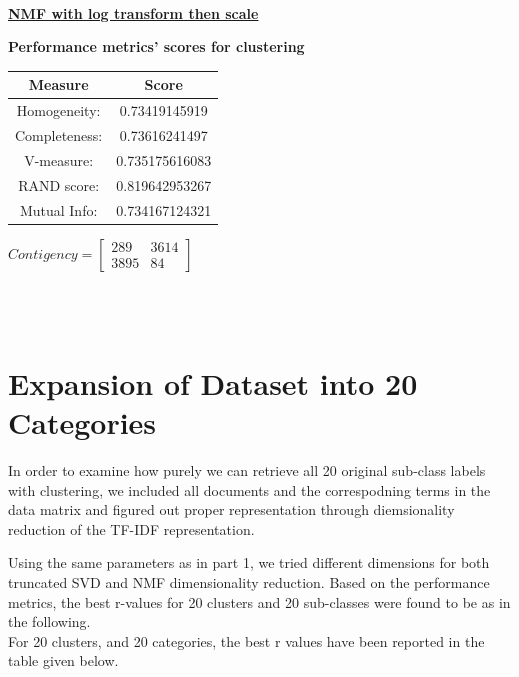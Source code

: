 \documentclass{report}
\begin{document}
\\

\underline{\textbf{NMF with log transform then scale}}\\

\begin{center}
	\textbf{Performance metrics' scores for clustering} \\ \vspace{5pt}
	\begin{tabular}{*{2}{c}}			
			\toprule
			\textbf{Measure} & \textbf{Score} \\
			\midrule			
			Homogeneity: & 0.73419145919 \\
			\midrule
			Completeness: & 0.73616241497 \\
			\midrule
			V-measure: & 0.735175616083 \\
			\midrule
			RAND score: & 0.819642953267 \\
			\midrule
			Mutual Info: & 0.734167124321 \\
			\bottomrule
	\end{tabular}
	\qquad
	$Contigency = \left[\begin{array}{*{2}{c}}
		 289 & 3614 \\
	 	 3895 & 84    
		    \end{array}\right]
    $
\end{center}
\\

\vspace{20pt}
\\

\section*{Expansion of Dataset into 20 Categories}
In order to examine how purely we can retrieve all 20 original sub-class labels with clustering, we included all documents and the correspodning terms in the data matrix and figured out proper representation through diemsionality reduction of the TF-IDF representation.

Using the same parameters as in part 1, we tried different dimensions for both truncated SVD and NMF dimensionality reduction. Based on the performance metrics, the best r-values for 20 clusters and 20 sub-classes were found to be as in the following. \\

For 20 clusters, and 20 categories, the best r values have been reported in the table given below. \\
\end{document}
